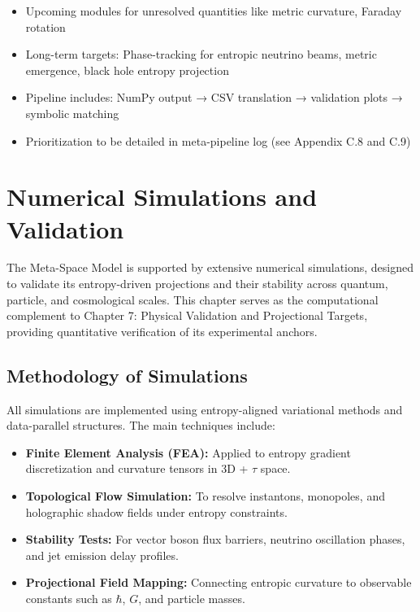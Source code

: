 \documentclass[10.5pt,a4paper]{article}
\begin{document}
\begin{itemize}
  \item Upcoming modules for unresolved quantities like metric curvature, Faraday rotation
  \item Long-term targets: Phase-tracking for entropic neutrino beams, metric emergence, black hole entropy projection
  \item Pipeline includes: NumPy output → CSV translation → validation plots → symbolic matching
  \item Prioritization to be detailed in meta-pipeline log (see Appendix C.8 and C.9)
\end{itemize}

\clearpage

\section{Numerical Simulations and Validation}

The Meta-Space Model is supported by extensive numerical simulations, designed to validate its entropy-driven projections and their stability across quantum, particle, and cosmological scales. This chapter serves as the computational complement to Chapter 7: Physical Validation and Projectional Targets, providing quantitative verification of its experimental anchors.

\subsection{Methodology of Simulations}

All simulations are implemented using entropy-aligned variational methods and data-parallel structures. The main techniques include:

\begin{itemize}
  \item \textbf{Finite Element Analysis (FEA):} Applied to entropy gradient discretization and curvature tensors in 3D + \(\tau\) space.
  \item \textbf{Topological Flow Simulation:} To resolve instantons, monopoles, and holographic shadow fields under entropy constraints.
  \item \textbf{Stability Tests:} For vector boson flux barriers, neutrino oscillation phases, and jet emission delay profiles.
  \item \textbf{Projectional Field Mapping:} Connecting entropic curvature to observable constants such as \(\hbar\), \(G\), and particle masses.
\end{itemize}
\end{document}
